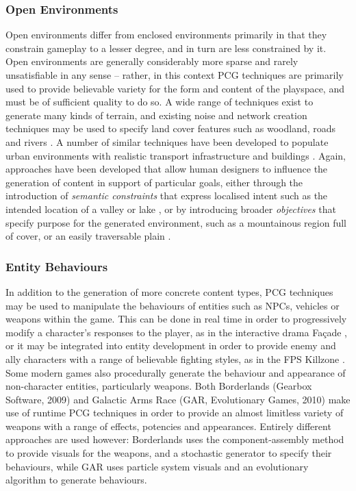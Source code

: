 \documentclass{acm_proc_article-sp}
\begin{document}
\subsubsection{Open Environments}
Open environments differ from enclosed environments primarily in that they constrain gameplay to a lesser degree, and in turn are less constrained by it. Open environments are generally considerably more sparse and rarely unsatisfiable in any sense -- rather, in this context PCG techniques are primarily used to provide believable variety for the form and content of the playspace, and must be of sufficient quality to do so. A wide range of techniques exist to generate many kinds of terrain, and existing noise and network creation techniques may be used to specify land cover features such as woodland, roads and rivers \cite{raffe2012survey,perlin2002improving}. A number of similar techniques have been developed to populate urban environments with realistic transport infrastructure and buildings \cite{carli2011survey}. Again, approaches have been developed that allow human designers to influence the generation of content in support of particular goals, either through the introduction of \textit{semantic constraints} that express localised intent such as the intended location of a valley or lake \cite{smelik2011semantic}, or by introducing broader \textit{objectives} that specify purpose for the generated environment, such as a mountainous region full of cover, or an easily traversable plain \cite{togelius2010towards}.

\newpage
\subsubsection{Entity Behaviours}
\label{sec:GAR1}
In addition to the generation of more concrete content types, PCG techniques may be used to manipulate the behaviours of entities such as NPCs, vehicles or weapons within the game. This can be done in real time in order to progressively modify a character's responses to the player, as in the interactive drama Fa{\c{c}}ade \cite{mateas2007writing}, or it may be integrated into entity development in order to provide enemy and ally characters with a range of believable fighting styles, as in the FPS Killzone \cite{straatman2005killzone}.
Some modern games also procedurally generate the behaviour and appearance of non-character entities, particularly weapons. Both Borderlands (Gearbox Software, 2009) and Galactic Arms Race (GAR, Evolutionary Games, 2010) make use of runtime PCG techniques in order to provide an almost limitless variety of weapons with a range of effects, potencies and appearances. Entirely different approaches are used however: Borderlands uses the component-assembly method to provide visuals for the weapons, and a stochastic generator to specify their behaviours, while GAR uses particle system visuals and an evolutionary algorithm to generate behaviours.
\end{document}
